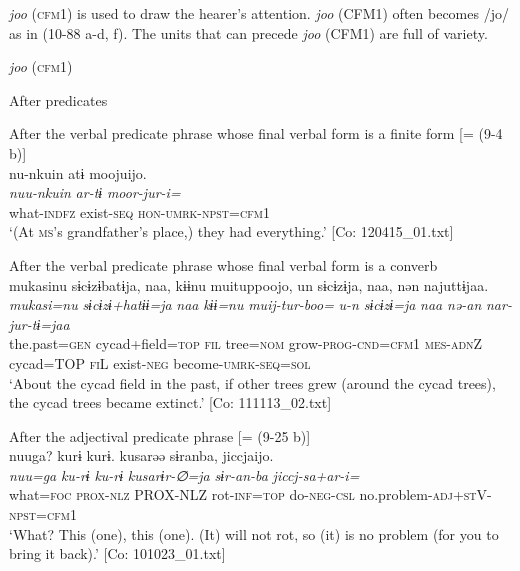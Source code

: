 \textit{joo} (\textsc{cfm}1) is used to draw the hearer’s attention. \textit{joo} (CFM1) often becomes /jo/ as in (10-88 a-d, f). The units that can precede \textit{joo} (CFM1) are full of variety.

\ea\label{ex:10.88}   \textit{joo} (\textsc{cfm}1)\\
    \begin{xlist}
  \exi{} After predicates

  \ex  After the verbal predicate phrase whose final verbal form is a finite form [= (9-4 b)]\\
      \glll    nu-nkuin  atɨ  moojuijo.\\
      \textit{nuu-nkuin}  \textit{ar-tɨ}  \textit{moor-jur-i=}\\
      what-\textsc{indfz}  exist-\textsc{seq}  \textsc{hon}-\textsc{umrk}-\textsc{npst}=\textsc{cfm}1\\
      \glt       ‘(At \textsc{ms}’s grandfather’s place,) they had everything.’ [Co: 120415\_01.txt]

  \ex After the verbal predicate phrase whose final verbal form is a converb\\
      \glll    mukasinu  sɨcɨzɨbatɨja,  naa,  kɨɨnu  muituppoojo,  un  sɨcɨzɨja,  naa,  nən  najuttɨjaa.\\
      \textit{mukasi=nu}  \textit{sɨcɨzɨ+hatɨɨ=ja}  \textit{naa}  \textit{kɨɨ=nu}  \textit{muij-tur-boo=}     \textit{u-n}  \textit{sɨcɨzɨ=ja}  \textit{naa}  \textit{nə-an}  \textit{nar-jur-tɨ=jaa}\\
      the.past=\textsc{gen}  cycad+field=\textsc{top}  \textsc{fil}  tree=\textsc{nom}  grow-\textsc{prog}-\textsc{cnd}=\textsc{cfm}1  \textsc{mes}-\textsc{adn}Z  cycad=TOP  \textsc{fi}L  exist-\textsc{neg}  become-\textsc{umrk}-\textsc{seq}=\textsc{sol}\\
      \glt       ‘About the cycad field in the past, if other trees grew (around the cycad trees), the cycad trees became extinct.’ [Co: 111113\_02.txt]

   \ex  After the adjectival predicate phrase [= (9-25 b)]\\
      \glll    nuuga?  kurɨ  kurɨ.  kusarəə  sɨranba,  jiccjaijo.\\
      \textit{nuu=ga}  \textit{ku-rɨ}  \textit{ku-rɨ}  \textit{kusarɨr-∅=ja}  \textit{sɨr-an-ba}  \textit{jiccj-sa+ar-i=}\\
      what=\textsc{foc}  \textsc{prox}-\textsc{nlz}  PROX-NLZ  rot-\textsc{inf}=\textsc{top}  do-\textsc{neg}-\textsc{csl}  no.problem-\textsc{adj}+\textsc{st}V-\textsc{npst}=\textsc{cfm}1\\
      \glt       ‘What? This (one), this (one). (It) will not rot, so (it) is no problem (for you to bring it back).’ [Co: 101023\_01.txt]


\end{xlist}
